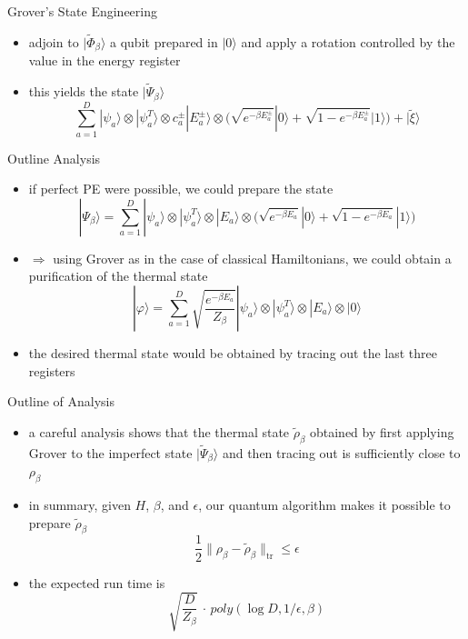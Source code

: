 \documentclass[slideColor]{prosper}
\renewcommand{\>}{\rangle}
\newcommand{\<}{\langle}
\begin{document}

\begin{slide}{Grover's State Engineering}

\begin{itemize}
\medskip
\item adjoin to $|\tilde{\Phi}_\beta\>$ a qubit prepared in $|0\>$ and apply a rotation controlled by the value in the energy register 

\medskip
\item this yields the state $|\tilde{\Psi}_\beta\>$
\[
\sum_{a=1}^D |\psi_a\> \otimes |\psi^T_a\> \otimes c_a^\pm |E_a^\pm\> \otimes 
\Big(
\sqrt{e^{-\beta E_a^\pm}} |0\> + \sqrt{1-e^{-\beta E_a^\pm}} |1\>
\Big)
 + |\tilde{\xi}\>
\]

\end{itemize}
\end{slide}


\begin{slide}{Outline Analysis}
\begin{itemize}
\item
if perfect PE were possible, we could prepare the state 
\[
|\Psi_\beta\> =
\sum_{a=1}^D |\psi_a\> \otimes |\psi^T_a\> \otimes |E_a\> 
\otimes 
\Big(
\sqrt{e^{-\beta E_a}}  |0\> + \sqrt{1-e^{-\beta E_a}} |1\> 
\Big)
\]

\medskip
\item $\Rightarrow$ using Grover as in the case of classical Hamiltonians,
we could obtain a purification of the thermal state
\[
|\varphi\> =
\sum_{a=1}^D 
\sqrt{\frac{e^{-\beta E_a}}{Z_\beta}}
|\psi_a\> \otimes |\psi^T_a\> \otimes |E_a\> 
\otimes 
|0\> 
\]

\item the desired thermal state would be obtained by tracing out the last three registers
\end{itemize}
\end{slide}


\begin{slide}{Outline of Analysis}
\begin{itemize}
\item a careful analysis shows that the thermal state $\tilde{\rho}_\beta$ obtained by first applying Grover to the imperfect state $|\tilde{\Psi}_\beta\>$ and then tracing out is sufficiently close to $\rho_\beta$

\bigskip
\item in summary, given $H$, $\beta$, and $\epsilon$, our quantum algorithm makes it possible to prepare $\tilde{\rho}_\beta$
\[
\frac{1}{2} \| \rho_\beta - \tilde{\rho}_\beta \|_{\mathrm{tr}} \le \epsilon 
\]

\item the expected run time is
\[
\sqrt{\frac{D}{Z_\beta}} \, \cdot \, poly(\log D, 1/\epsilon, \beta)
\]
\end{itemize}
\end{slide}
\end{document}
